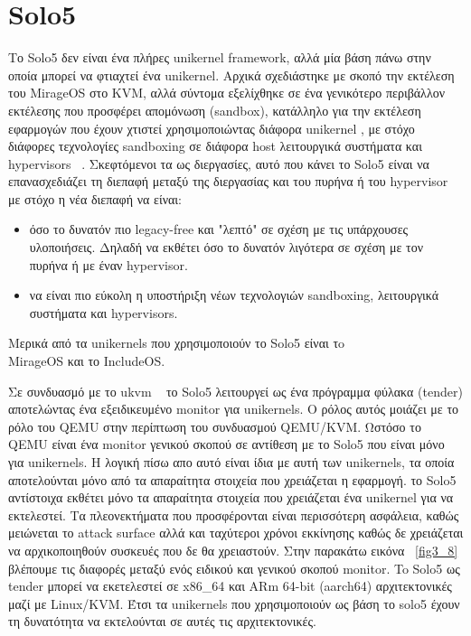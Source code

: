 \section{Solo5}

Το Solo5 δεν είναι ένα πλήρες unikernel framework, αλλά μία βάση πάνω στην οποία
μπορεί να φτιαχτεί ένα unikernel. Αρχικά σχεδιάστηκε με σκοπό την εκτέλεση του
MirageOS στο KVM, αλλά σύντομα εξελίχθηκε σε ένα γενικότερο περιβάλλον εκτέλεσης
που προσφέρει απομόνωση (sandbox), κατάλληλο για την εκτέλεση εφαρμογών που
έχουν χτιστεί χρησιμοποιώντας διάφορα unikernel , με στόχο διάφορες
τεχνολογίες sandboxing σε διάφορα host λειτουργικά συστήματα και hypervisors
~\cite{solo5_repo}. Σκεφτόμενοι τα  ως διεργασίες, αυτό που κάνει το
Solo5 είναι να επανασχεδιάζει τη διεπαφή μεταξύ της διεργασίας και του πυρήνα ή
του hypervisor ~\cite{solo5_technical} με στόχο η νέα διεπαφή να είναι: 
\begin{itemize}
	\item όσο το δυνατόν πιο legacy-free και "λεπτό" σε σχέση με τις
		υπάρχουσες υλοποιήσεις. Δηλαδή να εκθέτει όσο το δυνατόν
		λιγότερα σε σχέση με τον πυρήνα ή με έναν hypervisor.
	\item να είναι πιο εύκολη η υποστήριξη νέων τεχνολογιών sandboxing,
		λειτουργικά συστήματα και hypervisors. 
\end{itemize}
Μερικά από τα unikernels που χρησιμοποιούν το Solo5 είναι τo \\
MirageOS και το IncludeOS. 

Σε συνδυασμό με το ukvm ~\cite{williams2016unikernel} το Solo5 λειτουργεί ως ένα
πρόγραμμα φύλακα (tender) αποτελώντας ένα εξειδικευμένο monitor για unikernels.
Ο ρόλος αυτός μοιάζει με το ρόλο του QEMU στην περίπτωση του συνδυασμού
QEMU/KVM. Ωστόσο το QEMU είναι ένα monitor γενικού σκοπού σε αντίθεση με το
Solo5 που είναι μόνο για unikernels. Η λογική πίσω απο αυτό είναι ίδια με αυτή
των unikernels, τα οποία αποτελούνται μόνο από τα απαραίτητα στοιχεία που
χρειάζεται η εφαρμογή. το Solo5 αντίστοιχα εκθέτει μόνο τα απαραίτητα στοιχεία
που χρειάζεται ένα unikernel για να εκτελεστεί. Τα πλεονεκτήματα που
προσφέρονται είναι περισσότερη ασφάλεια, καθώς μειώνεται το attack surface αλλά
και 
ταχύτεροι χρόνοι εκκίνησης καθώς δε χρειάζεται να αρχικοποιηθούν συσκευές που δε
θα χρειαστούν. Στην παρακάτω εικόνα ~\ref{fig3_8} βλέπουμε τις διαφορές μεταξύ
ενός ειδικού και γενικού σκοπού monitor. To Solo5 ως tender μπορεί να
εκετελεστεί σε x86\_64 και ARm 64-bit (aarch64) αρχιτεκτονικές μαζί με Linux/KVM.
Έτσι τα unikernels που χρησιμοποιούν ως βάση το solo5 έχουν τη δυνατότητα να
εκτελούνται σε αυτές τις αρχιτεκτονικές.

